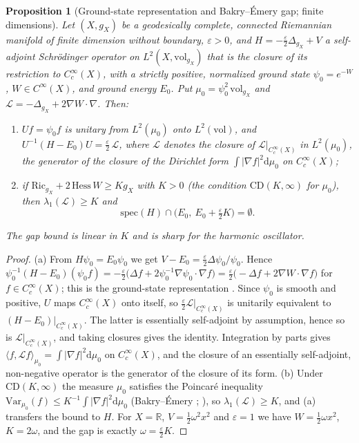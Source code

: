\documentclass[11pt,a4paper]{amsart}
\newtheorem{proposition}[theorem]{Proposition}
\theoremstyle{definition}
\newcommand{\R}{\mathbb{R}}
\newcommand{\cL}{\mathcal{L}}
\newcommand{\diff}{\mathrm{d}}
\newcommand{\Ric}{\mathrm{Ric}}
\newcommand{\Hess}{\mathrm{Hess}}
\begin{document}
\begin{proposition}[Ground-state representation and Bakry--\'Emery gap; finite dimensions]
\label{prop:ground_state}
Let $(X, g_X)$ be a geodesically complete, connected Riemannian manifold of finite dimension without boundary, $\varepsilon > 0$, and $H = -\frac{\varepsilon}{2}\Delta_{g_X} + V$ a self-adjoint Schr\"odinger operator on $L^2(X,\mathrm{vol}_{g_X})$ that is the closure of its restriction to $C_c^\infty(X)$, with a strictly positive, normalized ground state $\psi_0 = e^{-W}$, $W \in C^\infty(X)$, and ground energy $E_0$. Put $\mu_0 = \psi_0^2\,\mathrm{vol}_{g_X}$ and $\cL = -\Delta_{g_X} + 2\nabla W \cdot \nabla$. Then:
\begin{enumerate}[label=(\alph*)]
    \item $U f = \psi_0 f$ is unitary from $L^2(\mu_0)$ onto $L^2(\mathrm{vol})$, and $U^{-1}(H - E_0)U = \frac{\varepsilon}{2}\,\cL$, where $\cL$ denotes the closure of $\cL|_{C_c^\infty(X)}$ in $L^2(\mu_0)$, the generator of the closure of the Dirichlet form $\int |\nabla f|^2 \diff\mu_0$ on $C_c^\infty(X)$;
    \item if $\Ric_{g_X} + 2\,\Hess\, W \ge K g_X$ with $K > 0$ (the condition $\mathrm{CD}(K,\infty)$ for $\mu_0$), then $\lambda_1(\cL) \ge K$ and
    \begin{equation}
        \mathrm{spec}(H) \cap \big(E_0,\ E_0 + \tfrac{\varepsilon}{2} K\big) = \emptyset .
    \end{equation}
\end{enumerate}
The gap bound is linear in $K$ and is sharp for the harmonic oscillator.
\end{proposition}

\begin{proof}
(a) From $H\psi_0 = E_0\psi_0$ we get $V - E_0 = \frac{\varepsilon}{2}\Delta\psi_0/\psi_0$. Hence $\psi_0^{-1}(H - E_0)(\psi_0 f) = -\frac{\varepsilon}{2}\big(\Delta f + 2\psi_0^{-1}\nabla\psi_0\cdot\nabla f\big) = \frac{\varepsilon}{2}\big(-\Delta f + 2\nabla W\cdot\nabla f\big)$ for $f \in C_c^\infty(X)$; this is the ground-state representation \cite{glimm1987quantum}. Since $\psi_0$ is smooth and positive, $U$ maps $C_c^\infty(X)$ onto itself, so $\frac{\varepsilon}{2}\cL|_{C_c^\infty(X)}$ is unitarily equivalent to $(H - E_0)|_{C_c^\infty(X)}$. The latter is essentially self-adjoint by assumption, hence so is $\cL|_{C_c^\infty(X)}$, and taking closures gives the identity. Integration by parts gives $\langle f, \cL f\rangle_{\mu_0} = \int |\nabla f|^2\diff\mu_0$ on $C_c^\infty(X)$, and the closure of an essentially self-adjoint, non-negative operator is the generator of the closure of its form. (b) Under $\mathrm{CD}(K,\infty)$ the measure $\mu_0$ satisfies the Poincar\'e inequality $\mathrm{Var}_{\mu_0}(f) \le K^{-1}\int|\nabla f|^2\diff\mu_0$ (Bakry--\'Emery \cite{bakry1985diffusions}; \cite[\S4.8]{bakry2014analysis}), so $\lambda_1(\cL) \ge K$, and (a) transfers the bound to $H$. For $X = \R$, $V = \frac12\omega^2x^2$ and $\varepsilon = 1$ we have $W = \frac12\omega x^2$, $K = 2\omega$, and the gap is exactly $\omega = \frac{\varepsilon}{2}K$.
\end{proof}
\end{document}
